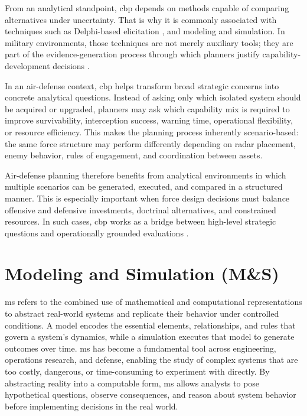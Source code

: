 From an analytical standpoint, \gls{cbp} depends on methods capable of comparing alternatives under uncertainty. That is why it is commonly associated with techniques such as Delphi-based elicitation \parencite{egfjord2020delphi}, and modeling and simulation. In military environments, those techniques are not merely auxiliary tools; they are part of the evidence-generation process through which planners justify capability-development decisions \parencite{hodicky2020cbp}.

In an air-defense context, \gls{cbp} helps transform broad strategic concerns into concrete analytical questions. Instead of asking only which isolated system should be acquired or upgraded, planners may ask which capability mix is required to improve survivability, interception success, warning time, operational flexibility, or resource efficiency. This makes the planning process inherently scenario-based: the same force structure may perform differently depending on radar placement, enemy behavior, rules of engagement, and coordination between assets.

Air-defense planning therefore benefits from analytical environments in which multiple scenarios can be generated, executed, and compared in a structured manner. This is especially important when force design decisions must balance offensive and defensive investments, doctrinal alternatives, and constrained resources. In such cases, \gls{cbp} works as a bridge between high-level strategic questions and operationally grounded evaluations \parencite{davis2002cbp,hodicky2020cbp}.

\section{Modeling and Simulation (M\&S)}
\label{sec:cap2-modeling-and-simulation-m-and-s}

\gls{ms} refers to the combined use of mathematical and computational representations to abstract real-world systems and replicate their behavior under controlled conditions. A model encodes the essential elements, relationships, and rules that govern a system's dynamics, while a simulation executes that model to generate outcomes over time. \gls{ms} has become a fundamental tool across engineering, operations research, and defense, enabling the study of complex systems that are too costly, dangerous, or time-consuming to experiment with directly. By abstracting reality into a computable form, \gls{ms} allows analysts to pose hypothetical questions, observe consequences, and reason about system behavior before implementing decisions in the real world.

